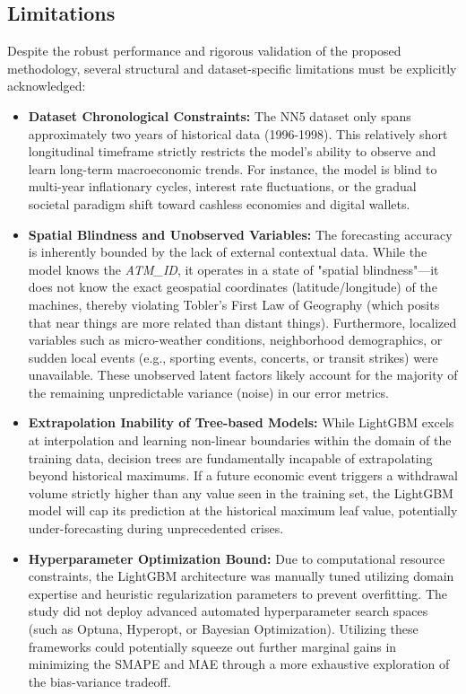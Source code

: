 \documentclass[conference, 12pt, onecolumn]{IEEEtran}
\begin{document}
\subsection{Limitations}
Despite the robust performance and rigorous validation of the proposed methodology, several structural and dataset-specific limitations must be explicitly acknowledged:
\begin{itemize}
    \item \textbf{Dataset Chronological Constraints:} The NN5 dataset only spans approximately two years of historical data (1996-1998). This relatively short longitudinal timeframe strictly restricts the model's ability to observe and learn long-term macroeconomic trends. For instance, the model is blind to multi-year inflationary cycles, interest rate fluctuations, or the gradual societal paradigm shift toward cashless economies and digital wallets.
    \item \textbf{Spatial Blindness and Unobserved Variables:} The forecasting accuracy is inherently bounded by the lack of external contextual data. While the model knows the \textit{ATM\_ID}, it operates in a state of "spatial blindness"—it does not know the exact geospatial coordinates (latitude/longitude) of the machines, thereby violating Tobler's First Law of Geography (which posits that near things are more related than distant things). Furthermore, localized variables such as micro-weather conditions, neighborhood demographics, or sudden local events (e.g., sporting events, concerts, or transit strikes) were unavailable. These unobserved latent factors likely account for the majority of the remaining unpredictable variance (noise) in our error metrics.
    \item \textbf{Extrapolation Inability of Tree-based Models:} While LightGBM excels at interpolation and learning non-linear boundaries within the domain of the training data, decision trees are fundamentally incapable of extrapolating beyond historical maximums. If a future economic event triggers a withdrawal volume strictly higher than any value seen in the training set, the LightGBM model will cap its prediction at the historical maximum leaf value, potentially under-forecasting during unprecedented crises.
    \item \textbf{Hyperparameter Optimization Bound:} Due to computational resource constraints, the LightGBM architecture was manually tuned utilizing domain expertise and heuristic regularization parameters to prevent overfitting. The study did not deploy advanced automated hyperparameter search spaces (such as Optuna, Hyperopt, or Bayesian Optimization). Utilizing these frameworks could potentially squeeze out further marginal gains in minimizing the SMAPE and MAE through a more exhaustive exploration of the bias-variance tradeoff.
\end{itemize}
\end{document}
